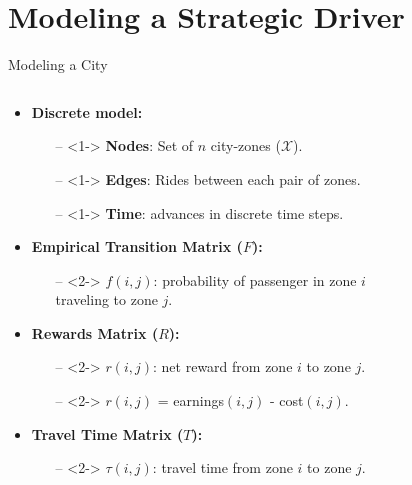 
\section{Modeling a Strategic Driver}
\begin{frame}{Modeling a City}
\begin{columns}
\begin{column}{0.70\textwidth}
\begin{itemize}
	\item<1->\textcolor{BlueGreen}{\bf Discrete model:}
		\begin{itemize}
			\item[--]<1-> {\bf Nodes}: Set of $n$ city-zones ($\mathcal{X}$).
			\item[--]<1-> {\bf Edges}: Rides between each pair of zones.
			\item[--]<1-> {\bf Time}: advances in discrete time steps.
		\end{itemize}
	\item<2->\textcolor{BlueGreen}{\bf Empirical Transition Matrix ($F$):}
		\begin{itemize}
			\item[--]<2-> $f(i,j)$: probability of passenger in zone $i$\\ traveling to zone $j$.
		\end{itemize}
	\item<2->\textcolor{BlueGreen}{\bf Rewards Matrix ($R$):}
		\begin{itemize}
			\item[--]<2-> $r(i,j)$: net reward from zone $i$ to zone $j$.
			\item[--]<2-> $r(i,j)$ = earnings$(i,j)$ - cost$(i,j)$.
		\end{itemize}
	\item<2->\textcolor{BlueGreen}{\bf Travel Time Matrix ($T$):}
		\begin{itemize}
			\item[--]<2-> $\tau(i,j)$: travel time from zone $i$ to zone $j$.
		\end{itemize}
\end{itemize}
\end{column}
\begin{column}{0.30\textwidth}
\end{column}
\end{columns}
\end{frame}
